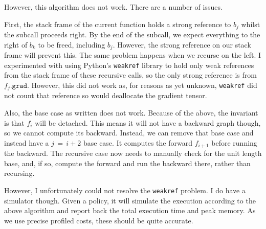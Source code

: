 However, this algorithm does not work.
There are a number of issues.

First, the stack frame of the current function holds a strong reference to \(b_j\) whilst the subcall proceeds right.
By the end of the subcall, we expect everything to the right of \(b_k\) to be freed, including \(b_j\).
However, the strong reference on our stack frame will prevent this.
The same problem happens when we recurse on the left.
I experimented with using Python's \texttt{weakref} library to hold only weak references from the stack frame of these recursive calls, so the only strong reference is from \(f_j\texttt{.grad}\).
However, this did not work as, for reasons as yet unknown, \texttt{weakref} did not count that reference so would deallocate the gradient tensor.

Also, the base case as written does not work.
Because of the above, the invariant is that \(f_i\) will be detached.
This means it will not have a backward graph though, so we cannot compute its backward.
Instead, we can remove that base case and instead have a \(j\,=\,i+2\) base case.
It computes the forward \(f_{i+1}\) before running the backward.
The recursive case now needs to manually check for the unit length base, and, if so, compute the forward and run the backward there, rather than recursing.

However, I unfortunately could not resolve the \texttt{weakref} problem.
I do have a simulator though.
Given a policy, it will simulate the execution according to the above algorithm and report back the total execution time and peak memory.
As we use precise profiled costs, these should be quite accurate.
